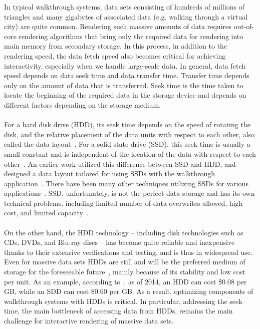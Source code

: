 In typical walkthrough systems, data sets consisting of hundreds of millions of
triangles and many gigabytes of associated data (e.g. walking through a virtual
city) are quite common. Rendering such massive amounts of data requires
out-of-core rendering algorithms that bring only the required data for
rendering into main memory from secondary storage. In this process, in addition
to the rendering speed, the data fetch speed also becomes critical for
achieving interactivity, especially when we handle large-scale data. In
general, data fetch speed depends on data seek time and data transfer time.
Transfer time depends only on the amount of data that is transferred. Seek time
is the time taken to locate the beginning of the required data in the storage
device and depends on different factors depending on the storage medium. \\
\\
For a hard disk drive (HDD), its seek time depends on the speed of rotating the
disk,
and the relative placement of the data units with respect to each other, also
called the data layout~\cite{Rizvi10}. For a solid state drive (SSD), this seek
time is usually a small constant and is independent of the location of the data
with respect to each other~\cite{SSD_perf08}. An earlier work utilized this
difference between SSD and HDD, and designed a data layout tailored for using
SSDs with the walkthrough application~\cite{ssdpaper}. There have been many
other techniques utilizing SSDs for various applications~\cite{FlashVM09}. SSD,
unfortunately, is not the perfect data storage and has its own technical
problems, including limited number of data overwrites allowed, high cost, and
limited capacity~\cite{Rizvi10}.  \\
\\
On the other hand, the HDD technology -- including disk technologies such as
CDs, DVDs, and Blu-ray discs -- has become quite reliable and inexpensive
thanks to their extensive verifications and testing, and is thus in widespread
use.  Even for massive data sets HDDs are still and will be
the preferred medium of storage for the foreseeable future~\cite{Rizvi10},
mainly
because of its stability and low cost per unit. As an example, according
to~\cite{pcmagarticle}, as of 2014, an HDD can cost \$0.08 per GB, while an SDD
can cost \$0.60 per GB. As a result, optimizing components of walkthrough
systems with HDDs is critical. In particular, addressing the seek time, the
main bottleneck of accessing data from HDDs, remains the main challenge for
interactive rendering of massive data sets. 

